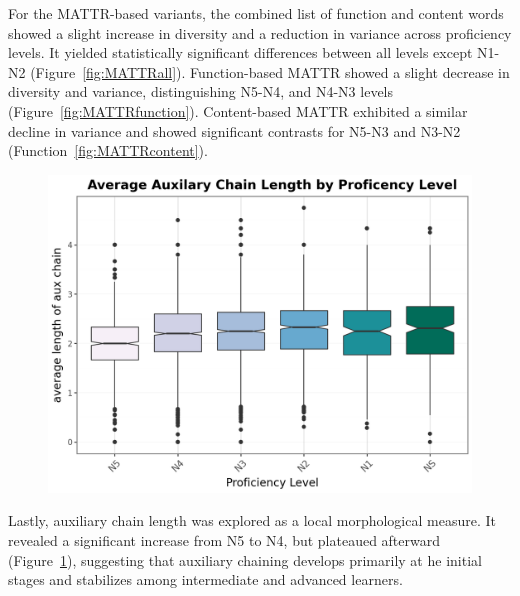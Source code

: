 


For the MATTR-based variants, the combined list of function and content words showed a slight increase in diversity
and a reduction in variance across proficiency levels. It yielded statistically significant differences between all
levels except N1-N2 (Figure~\ref{fig:MATTRall}). Function-based MATTR showed a slight decrease in diversity and
variance, distinguishing N5-N4, and N4-N3 levels (Figure~\ref{fig:MATTRfunction}). Content-based MATTR exhibited a
similar decline in variance and showed significant contrasts for N5-N3 and N3-N2 (Function~\ref{fig:MATTRcontent}).

\begin{figure}[htpb]
\centering
\includegraphics[scale=.5]{img/auxchains}
\caption[Average Length of auxilary verb chains]{}
\label{fig:auxchain}
\end{figure}
Lastly, auxiliary chain length was explored as a local morphological measure. It revealed a significant increase
from N5 to N4, but plateaued afterward (Figure~\ref{fig:auxchain}), suggesting that auxiliary chaining develops
primarily
at he
initial stages
and stabilizes among intermediate and advanced learners.



